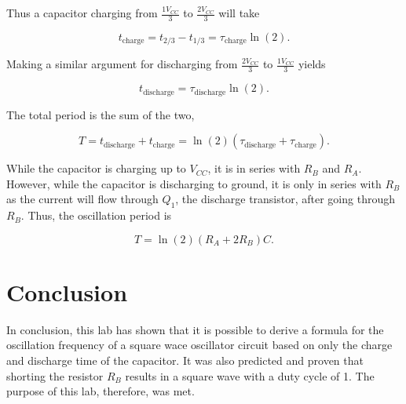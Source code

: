 \documentclass[12pt,letterpaper]{report}
\begin{document}
Thus a capacitor charging from $\frac{1V_{CC}}{3}$ to $\frac{2V_{CC}}{3}$ will take

$$
t_{\text{charge}} = t_{2/3} - t_{1/3} = \tau_{\text{charge}} \ln (2).
$$

Making a similar argument for discharging from $\frac{2V_{CC}}{3}$ to $\frac{1V_{CC}}{3}$ yields

$$
t_{\text{discharge}} = \tau_{\text{discharge}} \ln (2).
$$

The total period is the sum of the two,

$$
T = t_{\text{discharge}} + t_{\text{charge}} = \ln (2) (\tau_{\text{discharge}} + \tau_{\text{charge}}).
$$

While the capacitor is charging up to $V_{CC}$, it is in series with $R_B$ and $R_A$. However, while the capacitor is discharging to ground, it is only in series with $R_B$ as the current will flow through $Q_1$, the discharge transistor, after going through $R_B$. Thus, the oscillation period is

$$
T = \ln (2) (R_A + 2 R_B) C.
$$

\section*{Conclusion}

In conclusion, this lab has shown that it is possible to derive a formula for the oscillation frequency of a square wace oscillator circuit based on only the charge and discharge time of the capacitor. It was also predicted and proven that shorting the resistor $R_B$ results in a square wave with a duty cycle of 1. The purpose of this lab, therefore, was met.
\end{document}
